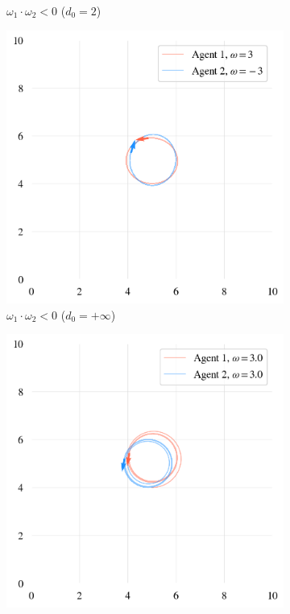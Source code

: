 \documentclass{article}
\begin{document}
\begin{figure}[H]
\begin{subfigure}[b]{0.49\textwidth}
		\vspace{-1cm}
		\caption{$\omega_1 \cdot \omega_2 < 0$ ($d_0=2$)}
	\end{subfigure}
	\begin{subfigure}[b]{0.49\textwidth}
		\includegraphics[width=\textwidth]{./figs/diffChirInf.png}
		\vspace{-1cm}
		\caption{$\omega_1 \cdot \omega_2 < 0$ ($d_0=+\infty$)}
	\end{subfigure}
	\begin{subfigure}[b]{0.49\textwidth}
		\includegraphics[width=\textwidth]{./figs/sameChirInf.png}

\end{subfigure}
\end{figure}
\end{document}
